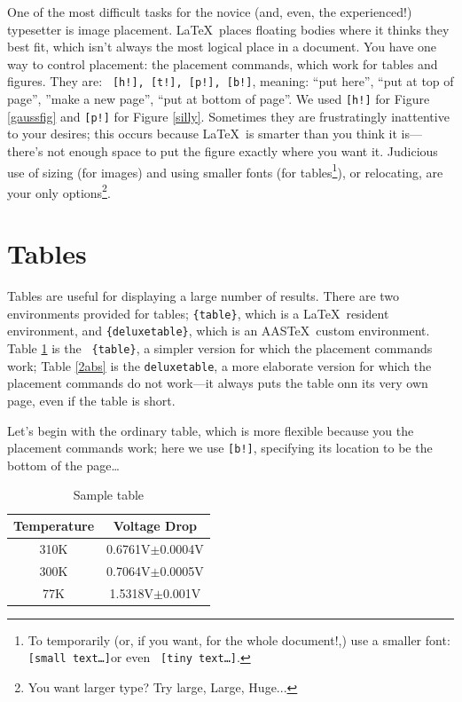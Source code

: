 \documentclass[12pt,preprint]{aastex}
\begin{document}
	One of the most difficult tasks for the novice (and, even, the
experienced!) typesetter is image placement.  \LaTeX\ places floating
bodies where it thinks they best fit, which isn't always the most
logical place in a document. You have one way to control placement: the
placement commands, which work for tables and figures. They are: {\tt
[h!], [t!], [p!], [b!]}, meaning: ``put here'', ``put at top of page'',
''make a new page'', ``put at bottom of page''. We used {\tt [h!]} for
Figure \ref{gaussfig} and {\tt [p!]} for Figure \ref{silly}. Sometimes
they are frustratingly inattentive to your desires; this occurs because
\LaTeX\ is smarter than you think it is---there's not enough space to
put the figure exactly where you want it. Judicious use of sizing (for
images) and using smaller fonts (for tables\footnote{To temporarily (or,
  if you want, for the whole document!,) use
a smaller font: {\tt {\small [small text\dots]}}or even {\tt {\tiny
[tiny text\dots]}}.}), or relocating, are your only options\footnote{You
  want larger type? Try {\large large}, {\Large Large}, {\Huge Huge}...}.

\section{Tables}\label{tablesec}

Tables are useful for displaying a large number of results.  There are
two environments provided for tables; \verb&{table}&, which is a
\LaTeX\ resident environment, and \verb&{deluxetable}&, which is an
AAS\TeX\ custom environment.  Table \ref{normtable} is the {\tt
  \{table\}}, a simpler version for which the placement commands work;
Table \ref{2abs} is the {\tt deluxetable}, a more elaborate version for
which the placement commands do not work---it always puts the table onn
its very own page, even if the table is short.

\noindent Let's begin with the ordinary table, which is more flexible
because you the placement commands work; here we use {\tt [b!]},
specifying its location to be the bottom of the page\dots

\begin{table}[!b]
\begin{center}
\caption{Sample table \label{normtable}}
\begin{tabular}{|c|c|} \hline
Temperature & Voltage Drop \\
\hline
\hline
310K & 0.6761V$\pm$0.0004V\\
\hline
300K & 0.7064V$\pm$0.0005V\\
\hline
77K & 1.5318V$\pm$0.001V\\
\hline
\end{tabular}
\end{center}
\end{table}
\end{document}
